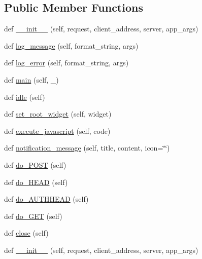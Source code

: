 \subsection*{Public Member Functions}
\begin{DoxyCompactItemize}
\item 
def \hyperlink{classremi_1_1server_1_1App_a5ed1b85fb59b973897ac43ac091809cc}{\+\_\+\+\_\+init\+\_\+\+\_\+} (self, request, client\+\_\+address, server, app\+\_\+args)
\item 
def \hyperlink{classremi_1_1server_1_1App_a2be308eef6fc7edbac1f466a785f770f}{log\+\_\+message} (self, format\+\_\+string, args)
\item 
def \hyperlink{classremi_1_1server_1_1App_a71930c51a480bb92af13f98524002df2}{log\+\_\+error} (self, format\+\_\+string, args)
\item 
def \hyperlink{classremi_1_1server_1_1App_af1da9c2e11558e446e88689d24cfedc7}{main} (self, \+\_\+)
\item 
def \hyperlink{classremi_1_1server_1_1App_af1322a72bf30958f7e12d8724ef551b8}{idle} (self)
\item 
def \hyperlink{classremi_1_1server_1_1App_ab47d0fc28c3bf057b23af2fe43106540}{set\+\_\+root\+\_\+widget} (self, widget)
\item 
def \hyperlink{classremi_1_1server_1_1App_a598177e1a1f52a309c79b9e797786aa2}{execute\+\_\+javascript} (self, code)
\item 
def \hyperlink{classremi_1_1server_1_1App_a77ebb63c24ac45cc18d8bc66351528bc}{notification\+\_\+message} (self, title, content, icon=\char`\"{}\char`\"{})
\item 
def \hyperlink{classremi_1_1server_1_1App_aa34df2fe60d807ebb4c7c8cc994b5327}{do\+\_\+\+P\+O\+ST} (self)
\item 
def \hyperlink{classremi_1_1server_1_1App_a25d39a4d4f9d32edb2e5a31f1eabd83d}{do\+\_\+\+H\+E\+AD} (self)
\item 
def \hyperlink{classremi_1_1server_1_1App_acce9e9f8d8f04dd984249ccc8d1bf066}{do\+\_\+\+A\+U\+T\+H\+H\+E\+AD} (self)
\item 
def \hyperlink{classremi_1_1server_1_1App_a95e6a5444f88a19af698be2601cc7f96}{do\+\_\+\+G\+ET} (self)
\item 
def \hyperlink{classremi_1_1server_1_1App_a7cbfd6854b7c503f45a9f7313a6349f6}{close} (self)
\item 
def \hyperlink{classremi_1_1server_1_1App_a5ed1b85fb59b973897ac43ac091809cc}{\+\_\+\+\_\+init\+\_\+\+\_\+} (self, request, client\+\_\+address, server, app\+\_\+args)

\end{DoxyCompactItemize}
